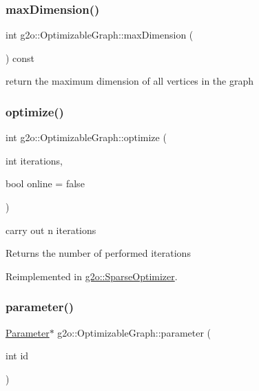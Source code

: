 \subsubsection{\texorpdfstring{max\+Dimension()}{maxDimension()}}
{\footnotesize\ttfamily int g2o\+::\+Optimizable\+Graph\+::max\+Dimension (\begin{DoxyParamCaption}{ }\end{DoxyParamCaption}) const}



return the maximum dimension of all vertices in the graph 

\mbox{\label{structg2o_1_1_optimizable_graph_ac1b2e36c05680dd3e60ed6f90dddf5d8}} 
\subsubsection{\texorpdfstring{optimize()}{optimize()}}
{\footnotesize\ttfamily int g2o\+::\+Optimizable\+Graph\+::optimize (\begin{DoxyParamCaption}\item[{int}]{iterations,  }\item[{bool}]{online = {\ttfamily false} }\end{DoxyParamCaption})\hspace{0.3cm}{\ttfamily [virtual]}}

carry out n iterations \begin{DoxyReturn}{Returns}
the number of performed iterations 
\end{DoxyReturn}


Reimplemented in \mbox{\hyperlink{classg2o_1_1_sparse_optimizer_a098257ee6f13dbb79be07075244d9930}{g2o\+::\+Sparse\+Optimizer}}.

\mbox{\label{structg2o_1_1_optimizable_graph_ad9506880a9289353ddd2277fafb76ffd}} 
\subsubsection{\texorpdfstring{parameter()}{parameter()}}
{\footnotesize\ttfamily \mbox{\hyperlink{classg2o_1_1_parameter}{Parameter}}$\ast$ g2o\+::\+Optimizable\+Graph\+::parameter (\begin{DoxyParamCaption}\item[{int}]{id }\end{DoxyParamCaption})\hspace{0.3cm}{\ttfamily [inline]}}

